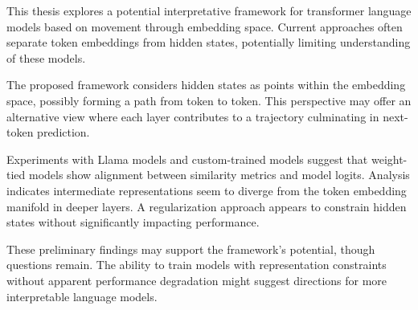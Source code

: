 This thesis explores a potential interpretative framework for transformer language models based on movement through embedding space. Current approaches often separate token embeddings from hidden states, potentially limiting understanding of these models.

The proposed framework considers hidden states as points within the embedding space, possibly forming a path from token to token. This perspective may offer an alternative view where each layer contributes to a trajectory culminating in next-token prediction.

Experiments with Llama models and custom-trained models suggest that weight-tied models show alignment between similarity metrics and model logits. Analysis indicates intermediate representations seem to diverge from the token embedding manifold in deeper layers. A regularization approach appears to constrain hidden states without significantly impacting performance.

These preliminary findings may support the framework's potential, though questions remain. The ability to train models with representation constraints without apparent performance degradation might suggest directions for more interpretable language models.
